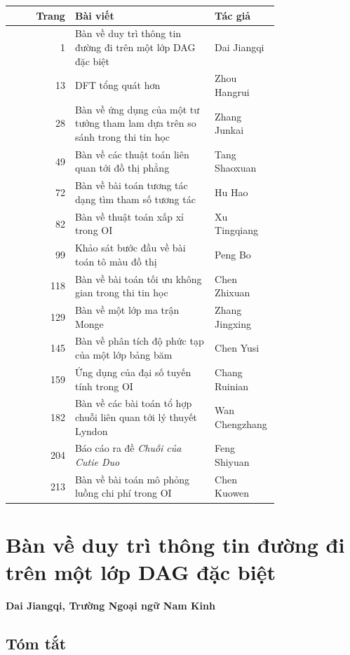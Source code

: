 \documentclass[11pt]{article}
\begin{document}
\begin{center}
\small
\begin{tabular}{r p{0.52\linewidth} p{0.24\linewidth}}
\textbf{Trang} & \textbf{Bài viết} & \textbf{Tác giả} \\
\hline
1 & Bàn về duy trì thông tin đường đi trên một lớp DAG đặc biệt & Dai Jiangqi \\
13 & DFT tổng quát hơn & Zhou Hangrui \\
28 & Bàn về ứng dụng của một tư tưởng tham lam dựa trên so sánh trong thi tin học & Zhang Junkai \\
49 & Bàn về các thuật toán liên quan tới đồ thị phẳng & Tang Shaoxuan \\
72 & Bàn về bài toán tương tác dạng tìm tham số tương tác & Hu Hao \\
82 & Bàn về thuật toán xấp xỉ trong OI & Xu Tingqiang \\
99 & Khảo sát bước đầu về bài toán tô màu đồ thị & Peng Bo \\
118 & Bàn về bài toán tối ưu không gian trong thi tin học & Chen Zhixuan \\
129 & Bàn về một lớp ma trận Monge & Zhang Jingxing \\
145 & Bàn về phân tích độ phức tạp của một lớp bảng băm & Chen Yusi \\
159 & Ứng dụng của đại số tuyến tính trong OI & Chang Ruinian \\
182 & Bàn về các bài toán tổ hợp chuỗi liên quan tới lý thuyết Lyndon & Wan Chengzhang \\
204 & Báo cáo ra đề \emph{Chuỗi của Cutie Duo} & Feng Shiyuan \\
213 & Bàn về bài toán mô phỏng luồng chi phí trong OI & Chen Kuowen \\
\end{tabular}
\end{center}

\section{Bàn về duy trì thông tin đường đi trên một lớp DAG đặc biệt}

\begin{center}
\textbf{Dai Jiangqi, Trường Ngoại ngữ Nam Kinh}
\end{center}

\subsection*{Tóm tắt}
\end{document}
